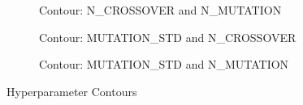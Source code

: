 \begin{figure}[ht]
     \centering
    \begin{subfigure}[t]{0.85\textwidth}
    \caption{Contour: N\_CROSSOVER and N\_MUTATION}
    \label{img:contour_cross_mutn}
    \end{subfigure}     
    \hfill
    \begin{subfigure}[t]{0.85\textwidth}
    \caption{Contour: MUTATION\_STD and N\_CROSSOVER}
    \label{img:contour_mutstd_cross}
    \end{subfigure}
    \hfill
    \begin{subfigure}[t]{0.85\textwidth}
    \caption{Contour: MUTATION\_STD and N\_MUTATION}
    \label{img:contour_mutstd_mutn}
    \end{subfigure}
    \caption{Hyperparameter Contours}
    \label{img:hyper_contour}  
\end{figure}


